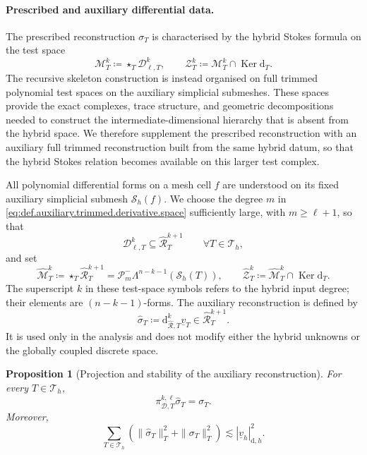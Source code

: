 \documentclass[a4paper,11pt]{article}
\newtheorem{proposition}[theorem]{Proposition}
\theoremstyle{definition}
\newcommand{\DIFF}{\mathrm{d}}
\newcommand{\Sh}{\mathcal{S}_h}
\newcommand{\PLtrim}[2]{\mathcal{P}_{#1}^{-}\Lambda^{#2}}
\newcommand{\Dpoly}[2]{\mathcal D_{\ell,#1}^{#2}}
\newcommand{\piD}[2]{\pi_{\mathcal D,#1}^{#2,\ell}}
\newcommand{\Ker}{\operatorname{Ker}}
\begin{document}
\paragraph*{Prescribed and auxiliary differential data.}

The prescribed reconstruction $\sigma_T$ is characterised by the hybrid Stokes formula on the test space
\[
  \mathcal M_T^k
  \coloneqq
  \star_T\Dpoly{T}{k},
  \qquad
  \mathcal Z_T^k
  \coloneqq
  \mathcal M_T^k\cap\Ker\DIFF_T.
\]
The recursive skeleton construction is instead organised on full trimmed polynomial test spaces on the auxiliary simplicial submeshes.
These spaces provide the exact complexes, trace structure, and geometric decompositions needed to construct the intermediate-dimensional hierarchy that is absent from the hybrid space.
We therefore supplement the prescribed reconstruction with an auxiliary full trimmed reconstruction built from the same hybrid datum, so that the hybrid Stokes relation becomes available on this larger test complex.

All polynomial differential forms on a mesh cell $f$ are understood on its fixed auxiliary simplicial submesh $\Sh(f)$.
We choose the degree $m$ in \eqref{eq:def.auxiliary.trimmed.derivative.space} sufficiently large, with $m\geq\ell+1$, so that
\[
  \Dpoly{T}{k}
  \subseteq
  \widehat{\mathcal R}_T^{k+1}
  \qquad
  \forall T\in\mathcal T_h,
\]
and set
\[
  \widehat{\mathcal M}_T^k
  \coloneqq
  \star_T\widehat{\mathcal R}_T^{k+1}
  =
  \PLtrim{m}{n-k-1}(\Sh(T)),
  \qquad
  \widehat{\mathcal Z}_T^k
  \coloneqq
  \widehat{\mathcal M}_T^k\cap\Ker\DIFF_T.
\]
The superscript $k$ in these test-space symbols refers to the hybrid input degree; their elements are $(n-k-1)$-forms.
The auxiliary reconstruction is defined by
\begin{equation}\label{eq:auxiliary.differential.data}
  \widehat\sigma_T
  \coloneqq
  \DIFF_{\widehat{\mathcal R},T}^{k}\underline v_T
  \in
  \widehat{\mathcal R}_T^{k+1}.
\end{equation}
It is used only in the analysis and does not modify either the hybrid unknowns or the globally coupled discrete space.

\begin{proposition}[Projection and stability of the auxiliary reconstruction]
\label{prop:auxiliary.projection.control}
For every $T\in\mathcal T_h$,
\begin{equation}\label{eq:auxiliary.projection}
  \piD{T}{k}\widehat\sigma_T
  =
  \sigma_T.
\end{equation}
Moreover,
\begin{equation}\label{eq:auxiliary.graph.control}
  \sum_{T\in\mathcal T_h}
  \left(
    \|\widehat\sigma_T\|_T^2
    +
    \|\sigma_T\|_T^2
  \right)
  \lesssim
  |\underline v_h|_{\DIFF,h}^2.
\end{equation}
\end{proposition}
\end{document}
